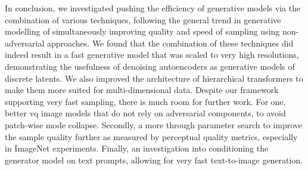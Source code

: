 In conclusion, we investigated pushing the efficiency of generative models via
the combination of various techniques, following the general trend in generative
modelling of simultaneously improving quality and speed of sampling using
non-adversarial approaches. We found that the combination of these techniques
did indeed result in a fast generative model that was scaled to very high
resolutions, demonstrating the usefulness of denoising autoencoders as
generative models of discrete latents. We also improved the architecture of
hierarchical transformers to make them more suited for multi-dimensional data.
Despite our framework supporting very fast sampling, there is much room for
further work. For one, better \gls{vq} image models that do not rely on
adversarial components, to avoid patch-wise mode collapse. Secondly, a more
through parameter search to improve the sample quality further as measured by
perceptual quality metrics, especially in ImageNet experiments. Finally, an
investigation into conditioning the generator model on text prompts, allowing
for very fast text-to-image generation.
